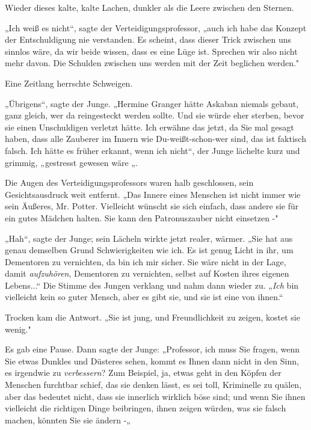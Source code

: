 {Wieder dieses kalte, kalte Lachen, dunkler als die Leere zwischen den Sternen.

„Ich weiß es nicht“, sagte der Verteidigungsprofessor, „auch ich habe das Konzept der Entschuldigung nie verstanden. Es scheint, dass dieser Trick zwischen uns sinnlos wäre, da wir beide wissen, dass es eine Lüge ist. Sprechen wir also nicht mehr davon. Die Schulden zwischen uns werden mit der Zeit beglichen werden."

Eine Zeitlang herrschte Schweigen.

„Übrigens“, sagte der Junge. „Hermine Granger hätte Askaban niemals gebaut, ganz gleich, wer da reingesteckt werden sollte. Und sie würde eher sterben, bevor sie einen Unschuldigen verletzt hätte. Ich erwähne das jetzt, da Sie mal gesagt haben, dass alle Zauberer im Innern wie Du-weißt-schon-wer sind, das ist faktisch falsch. Ich hätte es früher erkannt, wenn ich nicht“, der Junge lächelte kurz und grimmig, „gestresst gewesen wäre „.

Die Augen des Verteidigungsprofessors waren halb geschlossen, sein Gesichtsausdruck weit entfernt. „Das Innere eines Menschen ist nicht immer wie sein Äußeres, Mr. Potter. Vielleicht wünscht sie sich einfach, dass andere sie für ein gutes Mädchen halten. Sie kann den Patronuszauber nicht einsetzen -"

„Hah“, sagte der Junge; sein Lächeln wirkte jetzt realer, wärmer. „Sie hat aus genau demselben Grund Schwierigkeiten wie ich. Es ist genug Licht in ihr, um Dementoren zu vernichten, da bin ich mir sicher. Sie wäre nicht in der Lage, damit \emph{aufzuhören}, Dementoren zu vernichten, selbst auf Kosten ihres eigenen Lebens...“ Die Stimme des Jungen verklang und nahm dann wieder zu. „\emph{Ich} bin vielleicht kein so guter Mensch, aber es gibt sie, und sie ist eine von ihnen.“

Trocken kam die Antwort. „Sie ist jung, und Freundlichkeit zu zeigen, kostet sie wenig."

Es gab eine Pause. Dann sagte der Junge: „Professor, ich muss Sie fragen, wenn Sie etwas Dunkles und Düsteres sehen, kommt es Ihnen dann nicht in den Sinn, es irgendwie zu \emph{verbessern}? Zum Beispiel, ja, etwas geht in den Köpfen der Menschen furchtbar schief, das sie denken lässt, es sei toll, Kriminelle zu quälen, aber das bedeutet nicht, dass sie innerlich wirklich böse sind; und wenn Sie ihnen vielleicht die richtigen Dinge beibringen, ihnen zeigen würden, was sie falsch machen, könnten Sie sie ändern -„

}
